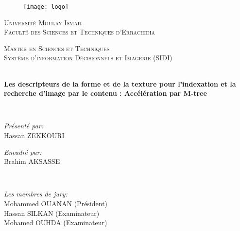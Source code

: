 \documentclass[
openany,
11pt, %
french, %
singlespacing, %
headsepline, %
]{MastersDoctoralThesis} %
\begin{document}
\begin{titlepage}
\begin{center}

\begin{figure}[H]
	\centering
	\texttt{[image: logo]}
\end{figure}
{\scshape\LARGE Université Moulay Ismail \\
	Faculté des Sciences et Techniques d’Errachidia \par}\vspace{1.5cm} %

\textsc{\Large Master en Sciences et Techniques \\ Système d’information Décisionnels et Imagerie (SIDI)}\\[0.5cm] %

\HRule \\[0.4cm] %
{\huge \bfseries Les descripteurs de la forme et de la texture pour l’indexation et la recherche d’image par le contenu : Accélération par M-tree \par}\vspace{0.4cm} %
\HRule \\[1.5cm] %
 
\begin{minipage}[t]{0.4\textwidth}
\begin{flushleft} \large
\emph{Présenté par:}\\
Hassan ZEKKOURI
\end{flushleft}
\end{minipage}
\begin{minipage}[t]{0.4\textwidth}
\begin{flushright} \large
\emph{Encadré par:} \\
 Brahim AKSASSE
 

\end{flushright}
\end{minipage}\\[1cm]

\begin{center} \large
	\emph{Les membres de jury:}\\
	
	Mohammed OUANAN (Président)\\
	Hassan SILKAN (Examinateur)\\
	Mohamed OUHDA (Examinateur)
\end{center}
 

\end{center}
\end{titlepage}
\end{document}
